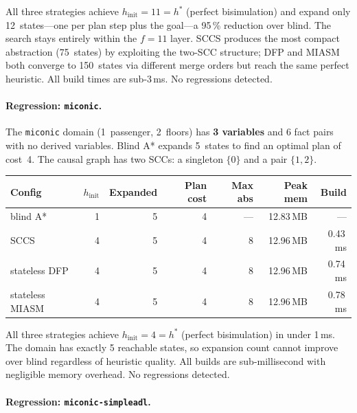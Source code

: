 \documentclass[11pt,a4paper]{article}
\begin{document}
All three strategies achieve $h_{\mathrm{init}} = 11 = h^*$ (perfect
bisimulation) and expand only 12~states---one per plan step plus the
goal---a 95\,\% reduction over blind.
The search stays entirely within the $f = 11$ layer.
SCCS produces the most compact abstraction (75~states) by exploiting the
two-SCC structure; DFP and MIASM both converge to 150~states via different
merge orders but reach the same perfect heuristic.
All build times are sub-3\,ms.
No regressions detected.

\paragraph{Regression: \texttt{miconic}.}

The \texttt{miconic} domain (1~passenger, 2~floors) has \textbf{3 variables}
and 6 fact pairs with no derived variables.
Blind A* expands 5~states to find an optimal plan of cost~4.
The causal graph has two SCCs: a singleton $\{0\}$ and a pair $\{1,2\}$.

\begin{center}
\small
\begin{tabular}{lrrrrrr}
\toprule
\textbf{Config} & \textbf{$h_{\mathrm{init}}$} & \textbf{Expanded}
  & \textbf{Plan cost} & \textbf{Max abs} & \textbf{Peak mem} & \textbf{Build} \\
\midrule
blind A*            & 1 & 5 & 4 & --- & 12.83\,MB & ---     \\
SCCS                & 4 & 5 & 4 &   8 & 12.96\,MB & 0.43\,ms \\
stateless DFP       & 4 & 5 & 4 &   8 & 12.96\,MB & 0.74\,ms \\
stateless MIASM     & 4 & 5 & 4 &   8 & 12.96\,MB & 0.78\,ms \\
\bottomrule
\end{tabular}
\end{center}

All three strategies achieve $h_{\mathrm{init}} = 4 = h^*$ (perfect
bisimulation) in under 1\,ms.
The domain has exactly 5 reachable states, so expansion count cannot
improve over blind regardless of heuristic quality.
All builds are sub-millisecond with negligible memory overhead.
No regressions detected.

\paragraph{Regression: \texttt{miconic-simpleadl}.}
\end{document}
